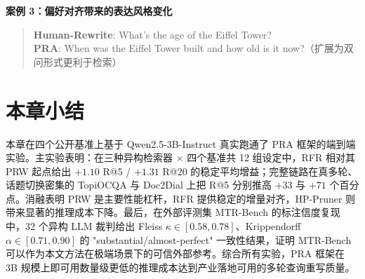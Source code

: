 \textbf{案例 3：偏好对齐带来的表达风格变化}

\begin{quote}
\textbf{Human-Rewrite}: What's the age of the Eiffel Tower?\\
\textbf{PRA}: When was the Eiffel Tower built and how old is it now?（扩展为双问形式更利于检索）
\end{quote}

\section{本章小结}
\label{sec:exp_summary}

本章在四个公开基准上基于 Qwen2.5-3B-Instruct 真实跑通了 PRA 框架的端到端实验。主实验表明：在三种异构检索器 $\times$ 四个基准共 12 组设定中，RFR 相对其 PRW 起点给出 $+1.10$ R@5 / $+1.31$ R@20 的稳定平均增益；完整链路在真多轮、话题切换密集的 TopiOCQA 与 Doc2Dial 上把 R@5 分别推高 $+33$ 与 $+71$ 个百分点。消融表明 PRW 是主要性能杠杆，RFR 提供稳定的增量对齐，HP-Pruner 则带来显著的推理成本下降。最后，在外部评测集 MTR-Bench 的标注信度复现中，32 个异构 LLM 裁判给出 Fleiss $\kappa\in[0.58, 0.78]$、Krippendorff $\alpha\in[0.71, 0.90]$ 的 "substantial/almost-perfect" 一致性结果，证明 MTR-Bench 可以作为本文方法在极端场景下的可信外部参考。综合所有实验，PRA 框架在 3B 规模上即可用数量级更低的推理成本达到产业落地可用的多轮查询重写质量。
